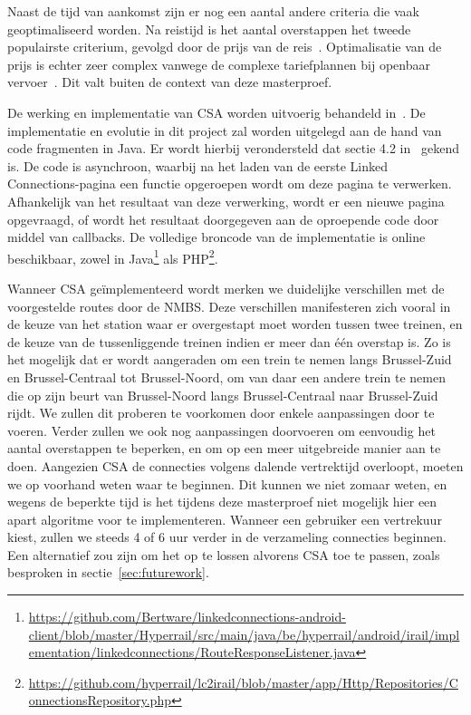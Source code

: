 Naast de tijd van aankomst zijn er nog een aantal andere criteria die vaak geoptimaliseerd worden. Na reistijd is het aantal overstappen het tweede populairste criterium, gevolgd door de prijs van de reis~\citep{strasser17}. Optimalisatie van de prijs is echter zeer complex vanwege de complexe tariefplannen bij openbaar vervoer~\citep{muller06}. Dit valt buiten de context van deze masterproef.

De werking en implementatie van CSA worden uitvoerig behandeld in~\citep{strasser17}. %
De implementatie en evolutie in dit project zal worden uitgelegd aan de hand van code fragmenten in Java. Er wordt hierbij verondersteld dat sectie 4.2 in~\cite{strasser17} gekend is. De code is asynchroon, waarbij na het laden van de eerste Linked Connections-pagina een  functie opgeroepen wordt om deze pagina te verwerken. Afhankelijk van het resultaat van deze verwerking, wordt er een nieuwe pagina opgevraagd, of wordt het resultaat doorgegeven aan de oproepende code door middel van callbacks. 
De volledige broncode van de implementatie is online beschikbaar, zowel in  Java\footnote{\url{https://github.com/Bertware/linkedconnections-android-client/blob/master/Hyperrail/src/main/java/be/hyperrail/android/irail/implementation/linkedconnections/RouteResponseListener.java}} als PHP\footnote{\url{https://github.com/hyperrail/lc2irail/blob/master/app/Http/Repositories/ConnectionsRepository.php}}.

Wanneer CSA geïmplementeerd wordt merken we duidelijke verschillen met de voorgestelde routes door de NMBS. Deze verschillen manifesteren zich vooral in de keuze van het station waar er overgestapt moet worden tussen twee treinen, en de keuze van de tussenliggende treinen indien er meer dan één overstap is. Zo is het mogelijk dat er wordt aangeraden om een trein te nemen langs Brussel-Zuid en Brussel-Centraal tot Brussel-Noord, om van daar een andere trein te nemen die op zijn beurt van Brussel-Noord langs Brussel-Centraal naar Brussel-Zuid rijdt. We zullen dit proberen te voorkomen door enkele aanpassingen door te voeren.
Verder zullen we ook nog aanpassingen doorvoeren om eenvoudig het aantal overstappen te beperken, en om op een meer uitgebreide manier aan  te doen. Aangezien CSA de connecties volgens dalende vertrektijd overloopt, moeten we op voorhand weten waar te beginnen. Dit kunnen we niet zomaar weten, en wegens de beperkte tijd is het tijdens deze masterproef niet mogelijk hier een apart algoritme voor te implementeren. Wanneer een gebruiker een vertrekuur kiest, zullen we steeds 4 of 6 uur verder in de verzameling connecties beginnen. Een alternatief zou zijn om het  op te lossen alvorens CSA toe te passen, zoals besproken in sectie~\ref{sec:futurework}.

